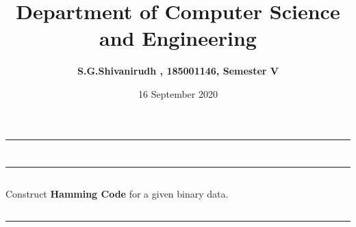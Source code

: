 \documentclass[12pt,letterpaper]{article}
\title{\textbf{Department of Computer Science and Engineering}}
\author{\textbf{S.G.Shivanirudh , 185001146, Semester V }}
\date{16 September 2020}
\begin{document}
\maketitle
\hrule
\section*{}
\hrule 
\bigskip\bigskip

\subsection*{}

\subsection*{}
\begin{flushleft}
Construct \textbf{Hamming Code} for a given binary data.
\end{flushleft}

\subsection*{}
\subsubsection*{}
\begin{flushleft}

\end{flushleft}
\subsubsection*{}
\begin{flushleft}

\end{flushleft}
\subsubsection*{}
\begin{flushleft}

\end{flushleft}

\subsection*{}
\subsubsection*{}
\begin{flushleft}

\end{flushleft}
\subsubsection*{}
\begin{flushleft}

\end{flushleft}
\hrule
\end{document}
